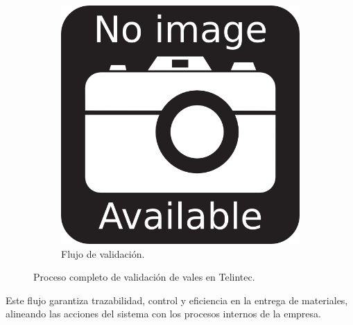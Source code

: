 \begin{figure}[h]
\centering
\begin{subfigure}{0.4\textwidth}
    \includegraphics[width=\textwidth]{imgs/no-image.png}
    \caption{Flujo de validación.}
    \label{fig:procesos1}
\end{subfigure}
\caption{Proceso completo de validación de vales en Telintec.}
\end{figure}

Este flujo garantiza trazabilidad, control y eficiencia en la entrega de materiales, alineando las acciones del sistema con los procesos internos de la empresa.
